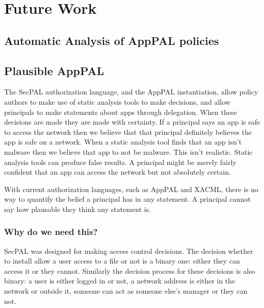 \documentclass[thesis.tex]{subfiles}
\begin{document}
\chapter{Future Work}

\section{Automatic Analysis of AppPAL policies}
\label{sec:lint}

\section{Plausible AppPAL}


\newcommand{\secpalmath}[1]{\ensuremath\texttt{#1}}
\newcommand{\AC}[0]{\ensuremath\text{AC}}
\newcommand{\says}[1]{\ensuremath~\secpalmath{says}^{\new{#1}}~}
\newcommand{\canSay}[1]{\secpalmath{can-say}_{#1}}
\newcommand{\canActAs}[0]{\secpalmath{can-act-as}}
\newcommand{\spif}[0]{\secpalmath{if}}
\newcommand{\where}[0]{\secpalmath{where}}

The SecPAL authorization language, and the AppPAL instantiation, allow
policy authors to make use of static analysis tools to make decisions,
and allow principals to make statements about apps through delegation.
When these decisions are made they are made with certainty.  If a
principal says an app is safe to access the network then we believe
that that principal definitely believes the app is safe on a network.
When a static analysis tool finds that an app isn't malware then we
believe that app to not be malware.  This isn't realistic.  Static
analysis tools can produce false results.  A principal might be merely
fairly confident that an app can access the network but not absolutely
certain.

With current authorization languages, such as AppPAL and XACML, there
is no way to quantify the belief a principal has in any statement.  A
principal cannot say how plausable they think any statement is.

\subsection{Why do we need this?}

SecPAL was designed for making access control decisions.  The decision
whether to install allow a user access to a file or not is a binary
one: either they can access it or they cannot.  Similarly the decision
process for these decisions is also binary: a user is either logged in
or not, a network address is either in the network or outside it,
someone can act as someone else's manager or they can not.
\end{document}
